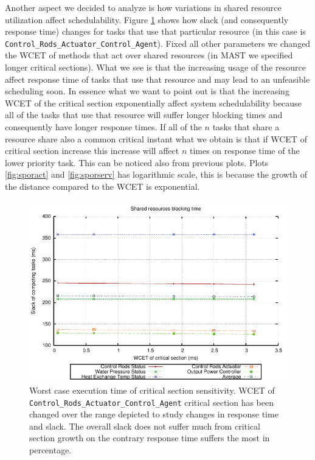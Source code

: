 \documentclass[10pt,a4paper]{report}
\begin{document}
Another aspect we decided to analyze is how variations in shared resource 
utilization affect schedulability. Figure \ref{fig:sensespo} shows how slack 
(and consequently response time) changes for tasks that use that particular 
resource (in this case is \texttt{Control\_Rods\_Actuator\_Control\_Agent}). 
Fixed all other parameters we changed the WCET of methods that act over shared 
resources (in MAST we specified longer critical sections). What we see is that 
the increasing usage of the resource affect response time of tasks that use that 
resource and may lead to an unfeasible scheduling soon. In essence what we want 
to point out is that the increasing WCET of the critical section exponentially 
affect system schedulability because all of the tasks that use that resource will
suffer longer blocking times and consequently have longer response times. 
If all of the $n$ tasks that share a resource share also a common critical 
instant what we obtain is that if WCET of critical section increase this 
increase will affect $n$ times on response time of the lower priority task.
This can be noticed also from previous plots. Plots \ref{fig:sporact} and 
\ref{fig:sporserv} has logarithmic scale, this is because the growth of the 
distance compared to the WCET is exponential. 

\begin{figure}[htb]
\centering
\includegraphics[width=\textwidth]{plots/sense_wcet}
\caption{
    Worst case execution time of critical section sensitivity. WCET of 
    \texttt{Control\_Rods\_Actuator\_Control\_Agent} critical section has been 
    changed over the range depicted to study changes in response time and slack.
    The overall slack does not suffer much from critical section growth on the 
    contrary response time suffers the most in percentage.
}
\label{fig:sensespo}
\end{figure}
\end{document}
